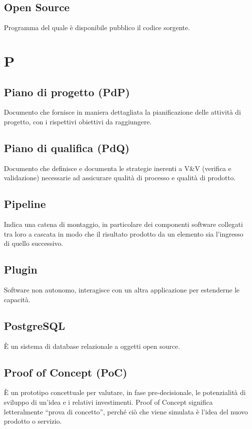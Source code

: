 \documentclass{classes/base}
\begin{document}
        \subsection*{Open Source}
        Programma del quale è disponibile pubblico il codice sorgente.
        \newpage  
    \section{P}
        \subsection*{Piano di progetto (PdP)}
        Documento che fornisce in maniera dettagliata la pianificazione delle attività di progetto, con i rispettivi obiettivi da raggiungere. 

        \subsection*{Piano di qualifica (PdQ)} 
        Documento che definisce e documenta le strategie inerenti a V\&V (verifica e validazione) necessarie ad assicurare qualità di processo e qualità di prodotto.

        \subsection*{Pipeline}
        Indica una catena di montaggio, in particolare dei componenti software collegati tra loro a cascata in modo che il risultato prodotto da un elemento sia l'ingresso di quello successivo.

        \subsection*{Plugin}
        Software non autonomo, interagisce con un altra applicazione per estenderne le capacità.

        \subsection*{PostgreSQL}
        È un sistema di database relazionale a oggetti open source.

        \subsection*{Proof of Concept (PoC)}
        È un prototipo concettuale per valutare, in fase pre-decisionale, le potenzialità di sviluppo di un’idea e i relativi investimenti. Proof of Concept significa letteralmente “prova di concetto”, perché ciò che viene simulata è l’idea del nuovo prodotto o servizio.
        
\end{document}
